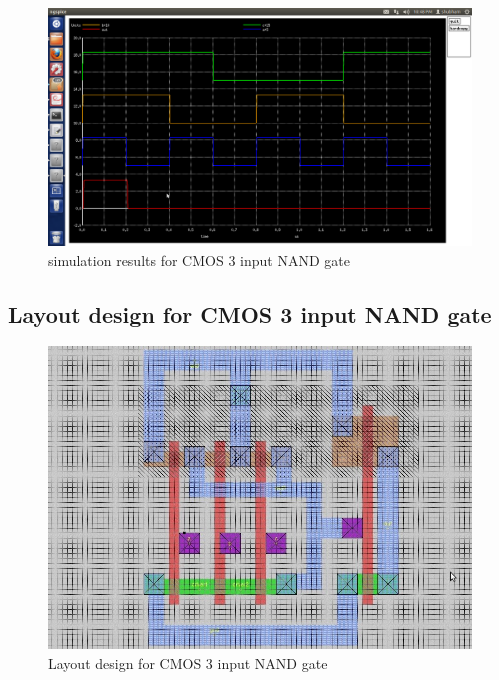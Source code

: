 \documentclass[12pt,a4paper]{article}
\begin{document}
\begin{center}
\vspace{10pt}
\begin{figure}[h]
\centering
\includegraphics[scale=.3]{3ipandsm.png}
\caption[Short]{simulation results for CMOS 3 input NAND gate }
\end{figure}

\clearpage


\subsection{Layout design for CMOS 3 input NAND gate}
\vspace{15pt}
\begin{figure}[h]
\centering
\includegraphics[scale=.4]{3ipnand_m.jpg}
\caption[Short]{Layout design for CMOS 3 input NAND gate }
\end{figure}



\end{center}
\end{document}
